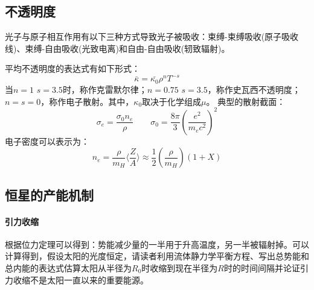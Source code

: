 \subsection{不透明度}
光子与原子相互作用有以下三种方式导致光子被吸收：束缚-束缚吸收(原子吸收线)、束缚-自由吸收(光致电离)和自由-自由吸收(轫致辐射)。

平均不透明度的表达式有如下形式：
\begin{equation}
	\bar{\kappa}=\bar{\kappa_{0}}\rho^{n}T^{-s}
\end{equation}
当$n=1$ $s=3.5$时，称作克雷默尔律；$n=0.75$ $s=3.5$，称作史瓦西不透明度；$n=s=0$，称作电子散射。其中，$\kappa_{0}$取决于化学组成$\mu$。
典型的散射截面：
\begin{equation}
	\sigma_{e}=\frac{\sigma_{0}n_{e}}{\rho} \qquad \sigma_{0}=\frac{8\pi}{3}\left(\frac{e^2}{m_{e}c^2}\right)^2
\end{equation}
电子密度可以表示为：
\begin{equation}
	n_{e}=\frac{\rho}{m_{H}}\langle\frac{Z}{A}\rangle\approx\frac{1}{2}\left(\frac{\rho}{m_{H}}\right)(1+X)
\end{equation}
\subsection{恒星的产能机制}
\paragraph{引力收缩}
根据位力定理可以得到：势能减少量的一半用于升高温度，另一半被辐射掉。可以计算得到，假设太阳的光度恒定，请读者利用流体静力学平衡方程、写出总势能和总内能的表达式估算太阳从半径为$R_{0}$时收缩到现在半径为$R$时的时间间隔并论证引力收缩不是太阳一直以来的重要能源。

